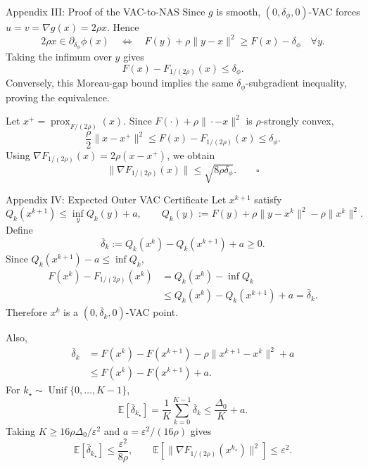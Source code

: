 \documentclass[10pt]{beamer}
\begin{document}
\begin{frame}{Appendix III: Proof of the VAC-to-NAS}
\footnotesize
Since $g$ is smooth, $(0,\delta_\phi,0)$-VAC forces
$u=v=\nabla g(x)=2\rho x$. Hence
\[
    2\rho x\in\partial_{\delta_\phi}\phi(x)
    \quad\Longleftrightarrow\quad
    F(y)+\rho\|y-x\|^2\ge F(x)-\delta_\phi
    \quad\forall y.
\]
Taking the infimum over $y$ gives
\[
    F(x)-F_{1/(2\rho)}(x)\le\delta_\phi.
\]
Conversely, this Moreau-gap bound implies the same
$\delta_\phi$-subgradient inequality, proving the equivalence.

\medskip
Let $x^+=\operatorname{prox}_{F/(2\rho)}(x)$. Since
$F(\cdot)+\rho\|\cdot-x\|^2$ is $\rho$-strongly convex,
\[
    \frac{\rho}{2}\|x-x^+\|^2
    \le F(x)-F_{1/(2\rho)}(x)
    \le\delta_\phi.
\]
Using $\nabla F_{1/(2\rho)}(x)=2\rho(x-x^+)$, we obtain
\[
    \bigl\|\nabla F_{1/(2\rho)}(x)\bigr\|
    \le\sqrt{8\rho\delta_\phi}.
    \qquad\square
\]
\end{frame}

\begin{frame}{Appendix IV: Expected Outer VAC Certificate}
\footnotesize
Let $x^{k+1}$ satisfy
\[
    Q_k(x^{k+1})\le\inf_y Q_k(y)+a,
    \qquad
    Q_k(y):=F(y)+\rho\|y-x^k\|^2-\rho\|x^k\|^2.
\]
Define
\[
    \bar\delta_k:=Q_k(x^k)-Q_k(x^{k+1})+a\ge0.
\]
Since $Q_k(x^{k+1})-a\le\inf Q_k$,
\[
\begin{aligned}
F(x^k)-F_{1/(2\rho)}(x^k)
&=Q_k(x^k)-\inf Q_k\\
&\le Q_k(x^k)-Q_k(x^{k+1})+a
 =\bar\delta_k.
\end{aligned}
\]
Therefore $x^k$ is a $(0,\bar\delta_k,0)$-VAC point.

\medskip
Also,
\[
\begin{aligned}
\bar\delta_k
&=F(x^k)-F(x^{k+1})-\rho\|x^{k+1}-x^k\|^2+a\\
&\le F(x^k)-F(x^{k+1})+a.
\end{aligned}
\]
For $k_\star\sim\operatorname{Unif}\{0,\ldots,K-1\}$,
\[
    \mathbb E[\bar\delta_{k_\star}]
    =\frac1K\sum_{k=0}^{K-1}\bar\delta_k
    \le\frac{\Delta_0}{K}+a.
\]
Taking $K\ge16\rho\Delta_0/\varepsilon^2$ and
$a=\varepsilon^2/(16\rho)$ gives
\[
\mathbb E[\bar\delta_{k_\star}]\le\frac{\varepsilon^2}{8\rho},
\qquad
\mathbb E\!\left[\|\nabla F_{1/(2\rho)}(x^{k_\star})\|^2\right]
\le\varepsilon^2.
\]
\end{frame}
\end{document}

